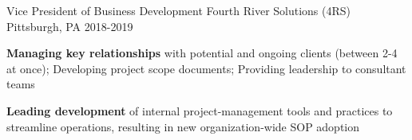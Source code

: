 \begin{cventries}
\cventry
    {Vice President of Business Development} %
    {Fourth River Solutions (4RS)} %
    {Pittsburgh, PA} %
    {2018-2019} %
    {
      \begin{cvitems} %
        \item {\textbf{Managing key relationships} with potential and ongoing clients (between 2-4 at once); Developing project scope documents; Providing leadership to consultant teams}
        \item {\textbf{Leading development} of internal project-management tools and practices to streamline operations, resulting in new organization-wide SOP adoption} 
      \end{cvitems}
    }
    \vspace*{-0.2cm}

\end{cventries}
